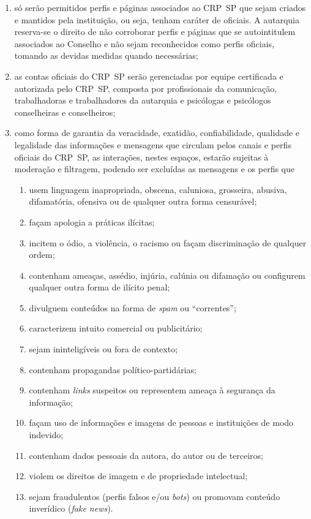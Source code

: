 \begin{enumerate}

	\item
	só serão permitidos perfis e páginas associados ao CRP~SP que sejam
	criados e mantidos pela instituição, ou seja, tenham caráter de
	oficiais. A autarquia reserva-se o direito de não corroborar perfis e
	páginas que se autointitulem associados ao Conselho e não sejam
	reconhecidos como perfis oficiais, tomando as devidas medidas quando
	necessárias;
	\item
	as contas oficiais do CRP~SP serão gerenciadas por equipe certificada
	e autorizada pelo CRP~SP, composta por profissionais da comunicação,
	trabalhadoras e trabalhadores da autarquia e psicólogas e psicólogos
	conselheiras e conselheiros;
	\item
	como forma de garantia da veracidade, exatidão, confiabilidade,
	qualidade e legalidade das informações e mensagens que circulam pelos
	canais e perfis oficiais do CRP~SP, as interações, nestes espaços,
	estarão sujeitas à moderação e filtragem, podendo ser excluídas as
	mensagens e os perfis que

	\begin{enumerate}

		\item
		usem linguagem inapropriada, obscena, caluniosa, grosseira, abusiva,
		difamatória, ofensiva ou de qualquer outra forma censurável;
		\item
		façam apologia a práticas ilícitas;
		\item
		incitem o ódio, a violência, o racismo ou façam discriminação de
		qualquer ordem;
		\item
		contenham ameaças, assédio, injúria, calúnia ou difamação ou
		configurem qualquer outra forma de ilícito penal;
		\item
		divulguem conteúdos na forma de \emph{spam} ou ``correntes'';
		\item
		caracterizem intuito comercial ou publicitário;
		\item
		sejam ininteligíveis ou fora de contexto;
		\item
		contenham propagandas político-partidárias;
		\item
		contenham \emph{links} suspeitos ou representem ameaça à segurança
		da informação;
		\item
		façam uso de informações e imagens de pessoas e instituições de modo
		indevido;
		\item
		contenham dados pessoais da autora, do autor ou de terceiros;
		\item
		violem os direitos de imagem e de propriedade intelectual;
		\item
		sejam fraudulentos (perfis falsos e/ou \emph{bots}) ou promovam
		conteúdo inverídico (\emph{fake news}).
	\end{enumerate}
\end{enumerate}


